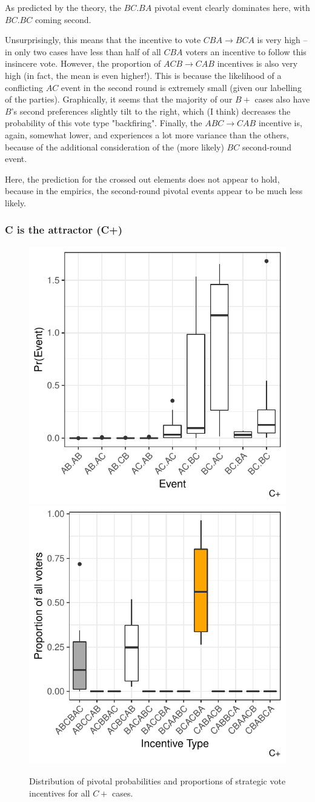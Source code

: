 \documentclass[11pt, letter]{article}
\begin{document}
As predicted by the theory, the $BC.BA$ pivotal event clearly dominates here, with $BC.BC$ coming second.

Unsurprisingly, this means that the incentive to vote $CBA \rightarrow BCA$ is very high -- in only two cases have less than half of all $CBA$ voters an incentive to follow this insincere vote. However, the proportion of $ACB \rightarrow CAB$ incentives is also very high (in fact, the mean is even higher!). This is because the likelihood of a conflicting $AC$ event in the second round is extremely small (given our labelling of the parties). Graphically, it seems that the majority of our $B+$ cases also have $B$'s second preferences slightly tilt to the right, which (I think) decreases the probability of this vote type "backfiring". Finally, the $ABC \rightarrow CAB$ incentive is, again, somewhat lower, and experiences a lot more variance than the others, because of the additional consideration of the (more likely) $BC$ second-round event. 

Here, the prediction for the crossed out elements does not appear to hold, because in the empirics, the second-round pivotal events appear to be much less likely.

\subsubsection{C is the attractor (C+)}

\begin{figure}[!htb]
	\centering
	\includegraphics[width = .45\textwidth]{../output/figures/prediction/pprob_sp_c.pdf}
	\includegraphics[width = .45\textwidth]{../output/figures/prediction/svinc_sp_c.pdf}
	\caption{Distribution of pivotal probabilities and proportions of strategic vote incentives for all $C+$ cases.}
	\label{fig:figure1}
\end{figure}
\end{document}
